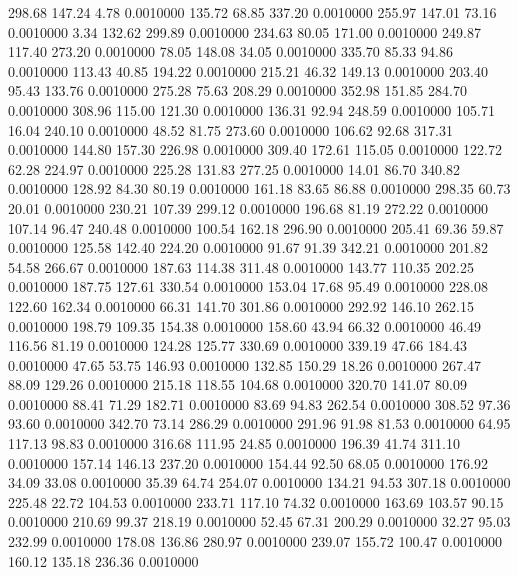  298.68  147.24    4.78   0.0010000
 135.72   68.85  337.20   0.0010000
 255.97  147.01   73.16   0.0010000
   3.34  132.62  299.89   0.0010000
 234.63   80.05  171.00   0.0010000
 249.87  117.40  273.20   0.0010000
  78.05  148.08   34.05   0.0010000
 335.70   85.33   94.86   0.0010000
 113.43   40.85  194.22   0.0010000
 215.21   46.32  149.13   0.0010000
 203.40   95.43  133.76   0.0010000
 275.28   75.63  208.29   0.0010000
 352.98  151.85  284.70   0.0010000
 308.96  115.00  121.30   0.0010000
 136.31   92.94  248.59   0.0010000
 105.71   16.04  240.10   0.0010000
  48.52   81.75  273.60   0.0010000
 106.62   92.68  317.31   0.0010000
 144.80  157.30  226.98   0.0010000
 309.40  172.61  115.05   0.0010000
 122.72   62.28  224.97   0.0010000
 225.28  131.83  277.25   0.0010000
  14.01   86.70  340.82   0.0010000
 128.92   84.30   80.19   0.0010000
 161.18   83.65   86.88   0.0010000
 298.35   60.73   20.01   0.0010000
 230.21  107.39  299.12   0.0010000
 196.68   81.19  272.22   0.0010000
 107.14   96.47  240.48   0.0010000
 100.54  162.18  296.90   0.0010000
 205.41   69.36   59.87   0.0010000
 125.58  142.40  224.20   0.0010000
  91.67   91.39  342.21   0.0010000
 201.82   54.58  266.67   0.0010000
 187.63  114.38  311.48   0.0010000
 143.77  110.35  202.25   0.0010000
 187.75  127.61  330.54   0.0010000
 153.04   17.68   95.49   0.0010000
 228.08  122.60  162.34   0.0010000
  66.31  141.70  301.86   0.0010000
 292.92  146.10  262.15   0.0010000
 198.79  109.35  154.38   0.0010000
 158.60   43.94   66.32   0.0010000
  46.49  116.56   81.19   0.0010000
 124.28  125.77  330.69   0.0010000
 339.19   47.66  184.43   0.0010000
  47.65   53.75  146.93   0.0010000
 132.85  150.29   18.26   0.0010000
 267.47   88.09  129.26   0.0010000
 215.18  118.55  104.68   0.0010000
 320.70  141.07   80.09   0.0010000
  88.41   71.29  182.71   0.0010000
  83.69   94.83  262.54   0.0010000
 308.52   97.36   93.60   0.0010000
 342.70   73.14  286.29   0.0010000
 291.96   91.98   81.53   0.0010000
  64.95  117.13   98.83   0.0010000
 316.68  111.95   24.85   0.0010000
 196.39   41.74  311.10   0.0010000
 157.14  146.13  237.20   0.0010000
 154.44   92.50   68.05   0.0010000
 176.92   34.09   33.08   0.0010000
  35.39   64.74  254.07   0.0010000
 134.21   94.53  307.18   0.0010000
 225.48   22.72  104.53   0.0010000
 233.71  117.10   74.32   0.0010000
 163.69  103.57   90.15   0.0010000
 210.69   99.37  218.19   0.0010000
  52.45   67.31  200.29   0.0010000
  32.27   95.03  232.99   0.0010000
 178.08  136.86  280.97   0.0010000
 239.07  155.72  100.47   0.0010000
 160.12  135.18  236.36   0.0010000
